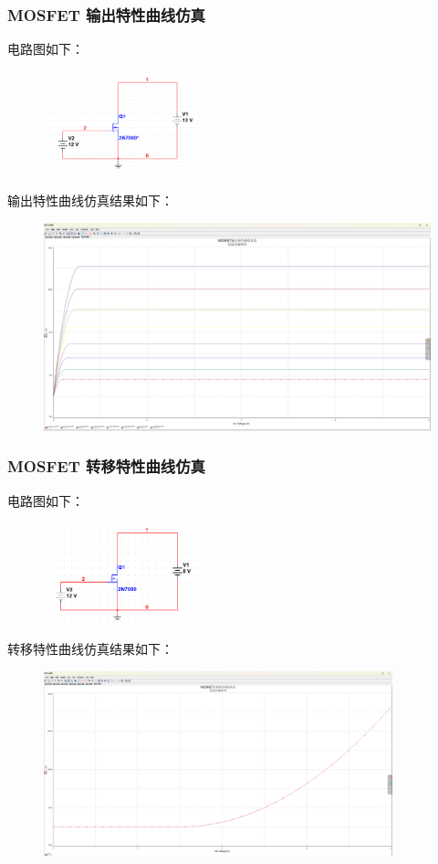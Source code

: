 \documentclass[a4paper,11pt,UTF8]{article}
\numberwithin{equation}{subsection}
\begin{document}
\subsubsection{MOSFET 输出特性曲线仿真}
电路图如下：
\begin{figure}[H]
	\centering
	\includegraphics[width=0.4\textwidth]{6.3.1}
\end{figure}
输出特性曲线仿真结果如下：
\begin{figure}[H]
	\centering
	\includegraphics[width=1\textwidth]{6.3.1_1}
\end{figure}
\subsubsection{MOSFET 转移特性曲线仿真}
电路图如下：
\begin{figure}[H]
	\centering
	\includegraphics[width=0.4\textwidth]{6.3.2}
\end{figure}
转移特性曲线仿真结果如下：
\begin{figure}[H]
	\centering
	\includegraphics[width=0.9\textwidth]{6.3.2_1}
\end{figure}
\end{document}
